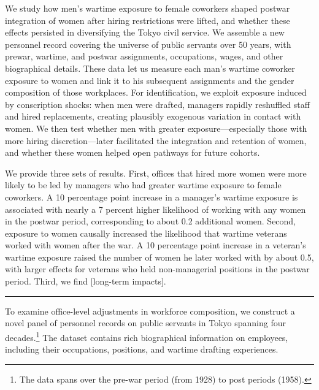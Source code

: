 We study how men's wartime exposure to female coworkers shaped postwar integration of women after hiring restrictions were lifted, and whether these effects persisted in diversifying the Tokyo civil service. We assemble a new personnel record covering the universe of public servants over 50 years, with prewar, wartime, and postwar assignments, occupations, wages, and other biographical details. These data let us measure each man's wartime coworker exposure to women and link it to his subsequent assignments and the gender composition of those workplaces. For identification, we exploit exposure induced by conscription shocks: when men were drafted, managers rapidly reshuffled staff and hired replacements, creating plausibly exogenous variation in contact with women. We then test whether men with greater exposure—especially those with more hiring discretion—later facilitated the integration and retention of women, and whether these women helped open pathways for future cohorts.


We provide three sets of results. First, offices that hired more women were more likely to be led by managers who had greater wartime exposure to female coworkers. A 10 percentage point increase in a manager's wartime exposure is associated with nearly a 7 percent higher likelihood of working with any women in the postwar period, corresponding to about 0.2 additional women. Second, exposure to women causally increased the likelihood that wartime veterans worked with women after the war. A 10 percentage point increase in a veteran's wartime exposure raised the number of women he later worked with by about 0.5, with larger effects for veterans who held non-managerial positions in the postwar period. Third, we find [long-term impacts].



\noindent\rule{\textwidth}{0.4pt}

To examine office-level adjustments in workforce composition, we construct a novel panel of personnel records on public servants in Tokyo spanning four decades.\footnote{The data spans over the pre-war period (from 1928) to post periods (1958).} The dataset contains rich biographical information on employees, including their occupations, positions, and wartime drafting experiences.

